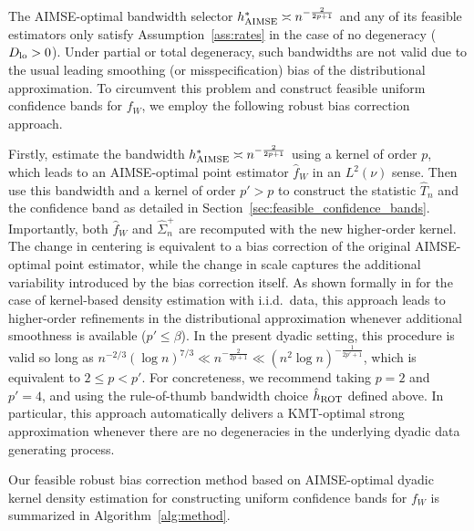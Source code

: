 The AIMSE-optimal bandwidth selector $h^*_{\operatorname{AIMSE}}\asymp n^{-\frac{2}{2p+1}}$
and any of its feasible estimators only satisfy
Assumption~\ref{ass:rates} in the case of no degeneracy ($D_{\textup{lo}}>0$).
Under partial or total degeneracy,
such bandwidths are not valid due to the usual leading
smoothing
(or misspecification) bias of the distributional approximation. To
circumvent this problem and construct feasible uniform confidence bands
for $f_W$, we employ the following robust bias correction approach.

Firstly, estimate the bandwidth $h^*_{\operatorname{AIMSE}}\asymp n^{-\frac{2}{2p+1}}$ using a
kernel of order $p$, which leads to an AIMSE-optimal point estimator
$\hat{f}_W$ in an $L^2(\nu)$ sense. Then use this bandwidth and a kernel of
order $p' > p$ to construct the statistic $\hat T_n$ and the confidence band
as detailed in Section~\ref{sec:feasible_confidence_bands}.
Importantly, both $\hat{f}_W$ and $\hat{\Sigma}^+_n$ are
recomputed with the new higher-order kernel.
The change in centering is equivalent to a bias correction
of the original AIMSE-optimal point estimator,
while the change in scale captures the additional variability
introduced by the bias correction itself.
As shown formally in
\citet{Calonico-Cattaneo-Farrell_2018_JASA,
Calonico-Cattaneo-Farrell_2022_Bernoulli}
for the case of kernel-based density estimation with i.i.d.\ data,
this approach leads to higher-order refinements in the distributional
approximation whenever additional smoothness is available ($p'\leq\beta$).
In the present dyadic setting, this procedure is valid so long as
$n^{-2/3} (\log n)^{7/3} \ll n^{-\frac{2}{2p+1}}
\ll (n^2 \log n)^{-\frac{1}{2p' + 1}}$,
which is equivalent to
$2 \leq p < p'$.
For concreteness, we recommend taking
$p = 2$ and $p' = 4$,
and using the rule-of-thumb bandwidth choice $\hat{h}_{\operatorname{ROT}}$ defined above.
In particular, this approach automatically delivers a KMT-optimal
strong approximation whenever there are no degeneracies in the
underlying dyadic data generating process.

Our feasible robust bias correction method based on AIMSE-optimal dyadic
kernel density estimation for constructing uniform confidence bands
for $f_W$ is summarized in Algorithm~\ref{alg:method}.

